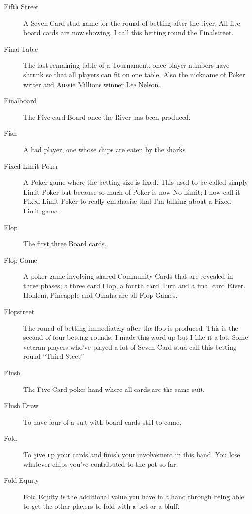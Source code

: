 \begin{description}
\item[Fifth Street] A Seven Card stud name for the round of betting
after the river. All five board cards are now showing. I call this betting
round the Finalstreet.

\item[Final Table] The last remaining table of a Tournament, once
player numbers have shrunk so that all players can fit on one
table. Also the nickname of Poker writer and Aussie Millions winner
Lee Nelson.

\item[Finalboard] The Five-card Board once the River has been
produced.

\item[Fish] A bad player, one whose chips are eaten by the sharks.

\item[Fixed Limit Poker] A Poker game where the betting size is
fixed. This used to be called simply Limit Poker but because so much
of Poker is now No Limit; I now call it Fixed Limit Poker to really
emphasise that I'm talking about a Fixed Limit game.

\item[Flop] The first three Board cards.

\item[Flop Game] A poker game involving shared Community Cards that
are revealed in three phases; a three card Flop, a fourth card Turn
and a final card River. Holdem, Pineapple and Omaha are all Flop
Games.

\item[Flopstreet] The round of betting immediately after the flop is
produced. This is the second of four betting rounds. I made this word
up but I like it a lot. Some veteran players who've played a lot of
Seven Card stud call this betting round ``Third Steet''

\item[Flush] The Five-Card poker hand where all cards are the same
suit.

\item[Flush Draw] To have four of a suit with board cards still to
come.

\item[Fold] To give up your cards and finish your involvement in this
hand. You lose whatever chips you've contributed to the pot so far.

\item[Fold Equity] Fold Equity is the additional value you have in a
hand through being able to get the other players to fold with a bet or
a bluff.


\end{description}
